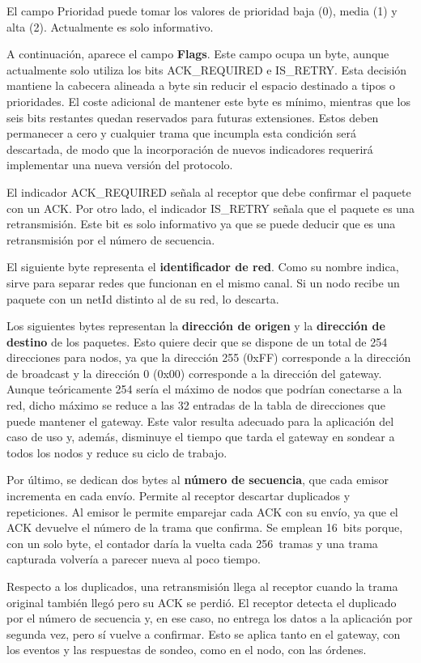 El campo Prioridad puede tomar los valores de prioridad baja (0), media (1) y alta (2). Actualmente es solo informativo.

A continuación, aparece el campo \textbf{Flags}. Este campo ocupa un byte, aunque actualmente solo utiliza los bits ACK\_REQUIRED e IS\_RETRY. Esta decisión mantiene la cabecera alineada a byte sin reducir el espacio destinado a tipos o prioridades. El coste adicional de mantener este byte es mínimo, mientras que los seis bits restantes quedan reservados para futuras extensiones. Estos deben permanecer a cero y cualquier trama que incumpla esta condición será descartada, de modo que la incorporación de nuevos indicadores requerirá implementar una nueva versión del protocolo.

El indicador ACK\_REQUIRED señala al receptor que debe confirmar el paquete con un ACK. Por otro lado, el indicador IS\_RETRY señala que el paquete es una retransmisión. Este bit es solo informativo ya que se puede deducir que es una retransmisión por el número de secuencia.  

El siguiente byte representa el \textbf{identificador de red}. Como su nombre indica, sirve para separar redes que funcionan en el mismo canal. Si un nodo recibe un paquete con un netId distinto al de su red, lo descarta.

Los siguientes bytes representan la \textbf{dirección de origen} y la \textbf{dirección de destino} de los paquetes. Esto quiere decir que se dispone de un total de 254 direcciones para nodos, ya que la dirección 255 (0xFF) corresponde a la dirección de broadcast y la dirección 0 (0x00) corresponde a la dirección del gateway. Aunque teóricamente 254 sería el máximo de nodos que podrían conectarse a la red, dicho máximo se reduce a las 32 entradas de la tabla de direcciones que puede mantener el gateway. Este valor resulta adecuado para la aplicación del caso de uso y, además, disminuye el tiempo que tarda el gateway en sondear a todos los nodos y reduce su ciclo de trabajo.

Por último, se dedican dos bytes al \textbf{número de secuencia}, que cada emisor incrementa en cada envío. Permite al receptor descartar duplicados y repeticiones. Al emisor le permite emparejar cada ACK con su envío, ya que el ACK devuelve el número de la trama que confirma. Se emplean 16~bits porque, con un solo byte, el contador daría la vuelta cada 256~tramas y una trama capturada volvería a parecer nueva al poco tiempo.

Respecto a los duplicados, una retransmisión llega al receptor cuando la trama original también llegó pero su ACK se perdió. El receptor detecta el duplicado por el número de secuencia y, en ese caso, no entrega los datos a la aplicación por segunda vez, pero sí vuelve a confirmar. Esto se aplica tanto en el gateway, con los eventos y las respuestas de sondeo, como en el nodo, con las órdenes.

